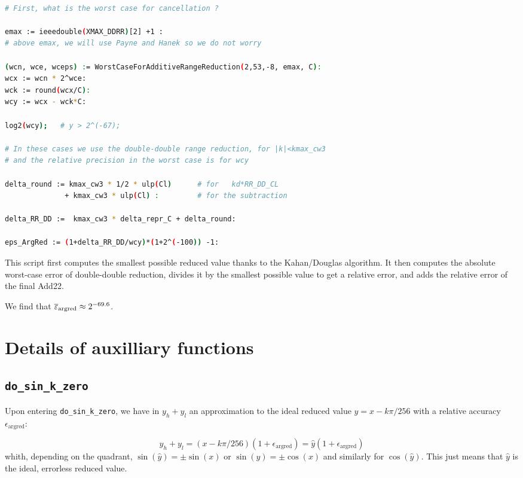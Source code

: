 \begin{lstlisting}[caption={Maple script computing the relative error bound of range reduction}, firstnumber=1,
  language={sh}, numbers=none]% of course it's maple
%Skip a line here, I don't know why, otherwise latex eats the first line

# First, what is the worst case for cancellation ?

emax := ieeedouble(XMAX_DDRR)[2] +1 :
# above emax, we will use Payne and Hanek so we do not worry

(wcn, wce, wceps) := WorstCaseForAdditiveRangeReduction(2,53,-8, emax, C):
wcx := wcn * 2^wce:
wck := round(wcx/C):
wcy := wcx - wck*C:

log2(wcy);   # y > 2^(-67);

# In these cases we use the double-double range reduction, for |k|<kmax_cw3
# and the relative precision in the worst case is for wcy

delta_round := kmax_cw3 * 1/2 * ulp(Cl)      # for   kd*RR_DD_CL
              + kmax_cw3 * ulp(Cl) :         # for the subtraction

delta_RR_DD :=  kmax_cw3 * delta_repr_C + delta_round:

eps_ArgRed := (1+delta_RR_DD/wcy)*(1+2^(-100)) -1:
\end{lstlisting}

This script first computes the smallest possible reduced value thanks
to the Kahan/Douglas algorithm. It then computes the absolute
worst-case error of double-double reduction, divides it by the
smallest possible value to get a relative error, and adds the relative
error of the final Add22.

 We find that
${\overline{\varepsilon}}_{\mathrm{argred}} \approx 2^{-69.6}$.




\section{Details of auxilliary functions
  \label{trigo:auxilliary}}

\subsection{\texttt{do\_sin\_k\_zero} \label{dosinkzero}}
Upon entering  \texttt{do\_sin\_k\_zero}, we have in
$y_h+y_l$ an approximation to the ideal reduced value
$\hat{y}=x-k\pi/256$ with a relative accuracy $\epsilon_{\mathrm{argred}}$:

\begin{equation}
  y_h+y_l = (x-k\pi/256)(1+\epsilon_{\mathrm{argred}}) 
  = \hat{y}(1+\epsilon_{\mathrm{argred}})
  \label{eq:sinargrederror1}
\end{equation}
whith, depending on the quadrant, $\sin(\hat{y}) = \pm\sin(x)$ or
$\sin(\hat{y}) = \pm\cos(x)$ and similarly for $\cos(\hat{y})$. This
just means that $\hat{y}$ is the ideal, errorless reduced value.

